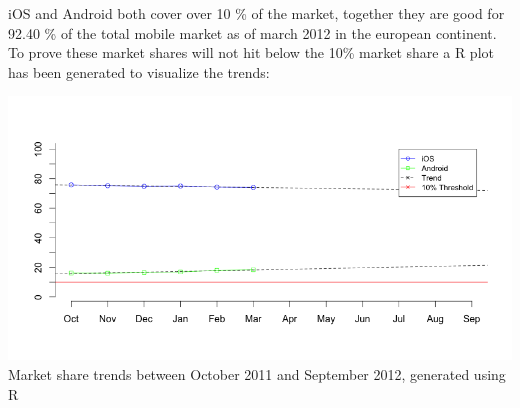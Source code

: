 \noindent iOS and Android both cover over 10 \% of the market, together they are good for 92.40 \% of the total mobile market as of march 2012 in the european continent. To prove these market shares will not hit below the 10\% market share a R plot has been generated to visualize the trends:

 \begin{centering}
 \includegraphics[scale=0.4]{images/platformtrends.png}\\{Market share trends between October 2011 and September 2012, generated using R}\\
 \end{centering}







